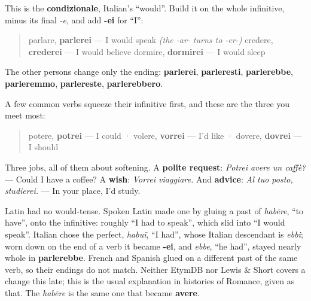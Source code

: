 \begin{grammarlens}[title={Grammar Lens: the -ei family}]
This is the \textbf{condizionale}, Italian's \textquotedblleft{}would\textquotedblright{}. Build it on the whole infinitive, minus its final \emph{-e}, and add \textbf{-ei} for \textquotedblleft{}I\textquotedblright{}:

\begin{quote}
parlare, \textbf{parlerei} — I would speak \emph{(the -ar- turns to -er-)} credere, \textbf{crederei} — I would believe dormire, \textbf{dormirei} — I would sleep
\end{quote}

The other persons change only the ending: \textbf{parlerei}, \textbf{parleresti}, \textbf{parlerebbe}, \textbf{parleremmo}, \textbf{parlereste}, \textbf{parlerebbero}.

A few common verbs squeeze their infinitive first, and these are the three you meet most:

\begin{quote}
potere, \textbf{potrei} — I could · volere, \textbf{vorrei} — I'd like · dovere, \textbf{dovrei} — I should
\end{quote}

Three jobs, all of them about softening. A \textbf{polite request}: \emph{Potrei avere un caffè?} — Could I have a coffee? A \textbf{wish}: \emph{Vorrei viaggiare.} And \textbf{advice}: \emph{Al tuo posto, studierei.} — In your place, I'd study.
\end{grammarlens}

\begin{cousinweb}
Latin had no would-tense. Spoken Latin made one by gluing a past of \emph{habēre}, \textquotedblleft{}to have\textquotedblright{}, onto the infinitive: roughly \textquotedblleft{}I had to speak\textquotedblright{}, which slid into \textquotedblleft{}I would speak\textquotedblright{}. Italian chose the perfect, \emph{habuī}, \textquotedblleft{}I had\textquotedblright{}, whose Italian descendant is \emph{ebbi}; worn down on the end of a verb it became \textbf{-ei}, and \emph{ebbe}, \textquotedblleft{}he had\textquotedblright{}, stayed nearly whole in \textbf{parlerebbe}. French and Spanish glued on a different past of the same verb, so their endings do not match. Neither EtymDB nor Lewis \& Short covers a change this late; this is the usual explanation in histories of Romance, given as that. The \emph{habēre} is the same one that became \textbf{avere}.
\end{cousinweb}

